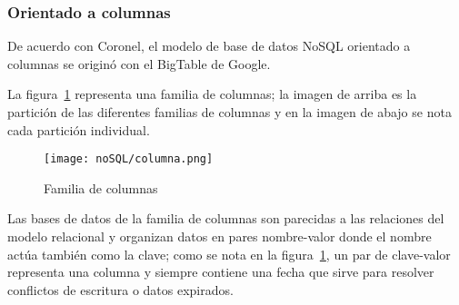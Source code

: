 \subsubsection{Orientado a columnas}
De acuerdo con Coronel\cite{coronel_database_nodate}, el modelo de base de datos NoSQL orientado a columnas se originó con el BigTable de Google. 

La figura~\ref{img:familia-columna} representa una familia de columnas; la imagen de arriba es la partición de las diferentes familias de columnas y en la imagen de abajo se nota cada partición individual.

\begin{figure}[H] 
    \centering
    \texttt{[image: noSQL/columna.png]}
    \caption{Familia de columnas}
    \label{img:familia-columna}
\end{figure}


Las bases de datos de la familia de columnas son parecidas a las relaciones del modelo relacional y organizan datos en pares nombre-valor donde el nombre actúa también como la clave; como se nota en la figura~\ref{img:familia-columna}, un par de clave-valor representa una columna y siempre contiene una fecha que sirve para resolver conflictos de escritura o datos expirados.
